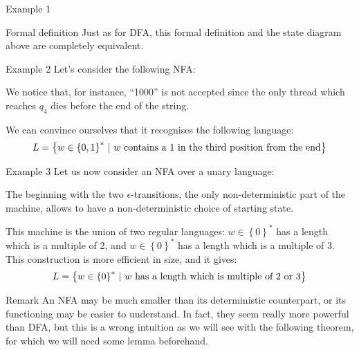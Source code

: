 \documentclass[a4paper]{article}
\begin{document}
\begin{parag}{Example 1}
\begin{subparag}{Formal definition}
        Just as for DFA, this formal definition and the state diagram above are completely equivalent.
    \end{subparag}
    
\end{parag}

\begin{parag}{Example 2}
    Let's consider the following NFA:

    We notice that, for instance, ``1000'' is not accepted since the only thread which reaches $q_4$ dies before the end of the string.

    We can convince ourselves that it recognises the following language: 
    \[L = \left\{w \in \left\{0, 1\right\}^* \suchthat w \text{ contains a 1 in the third position from the end}\right\}\]
\end{parag}

\begin{parag}{Example 3}
    Let us now consider an NFA over a unary language:

    The beginning with the two $\epsilon$-transitions, the only non-deterministic part of the machine, allows to have a non-deterministic choice of starting state. 

    This machine is the union of two regular languages: $w \in \left\{0\right\}^*$ has a length which is a multiple of 2, and $w \in \left\{0\right\}^*$ has a length which is a multiple of 3. This construction is more efficient in size, and it gives: 
    \[L = \left\{w \in \left\{0\right\}^* \suchthat w \text{ has a length which is multiple of 2 or 3}\right\}\]
\end{parag}

\begin{parag}{Remark}
    An NFA may be much smaller than its deterministic counterpart, or its functioning may be easier to understand. In fact, they seem really more powerful than DFA, but this is a wrong intuition as we will see with the following theorem, for which we will need some lemma beforehand.
\end{parag}
\end{document}
